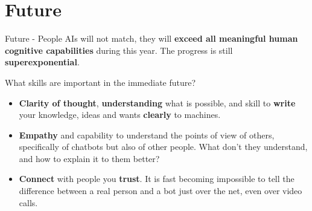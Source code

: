 \documentclass{beamer}
\begin{document}
\section{Future}
\begin{frame}{Future - People}
AIs will not match, they will \textbf{exceed all meaningful human cognitive capabilities} during this year. The progress is still \textbf{superexponential}.

What skills are important in the immediate future?
  \begin{itemize}
    \item \textbf{Clarity of thought}, \textbf{understanding} what is possible, and skill to \textbf{write} your knowledge, ideas and wants \textbf{clearly} to machines.
    \item \textbf{Empathy} and capability to understand the points of view of others, specifically of chatbots but also of other people. What don't they understand, and how to explain it to them better?
    \item \textbf{Connect} with people you \textbf{trust}. It is fast becoming impossible to tell the difference between a real person and a bot just over the net, even over video calls.
  \end{itemize}
\end{frame}
\end{document}
